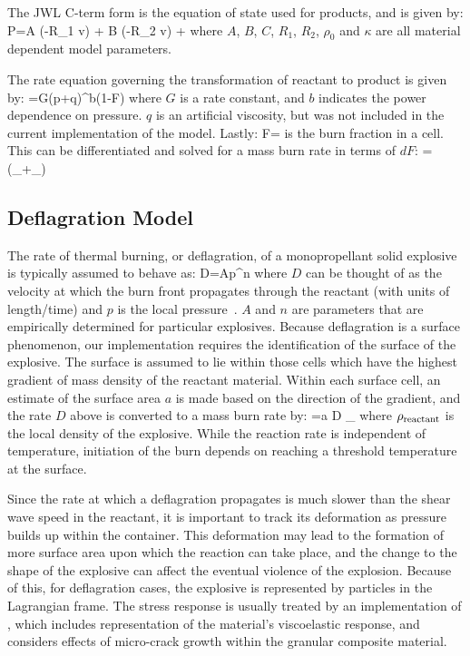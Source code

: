 The JWL C-term form is the equation of state used for products, and is 
given by:
\Beq
  P=A \exp(-R_1 v) + B \exp(-R_2 v) + 
  \label{JWLC}
\Eeq
where $A$, $B$, $C$, $R_1$, $R_2$, $\rho_0$ and $\kappa$ are all 
material dependent model parameters.

The rate equation governing the transformation of reactant to product is 
given by:
\Beq
  =G(p+q)^b(1-F)
  \label{JWL++rate}
\Eeq
where $G$ is a rate constant, and 
$b$ indicates the power dependence on pressure.  $q$ is an artificial 
viscosity, but was not included in the current implementation of
the model.  Lastly:
\Beq
  F= \frac{\rho_{\Tproduct}}{\rho_{\Treactant}+\rho_{\Tproduct}}
\Eeq
is the burn fraction in a cell.  This can be differentiated and solved for 
a mass burn rate in terms of $dF$:
\Beq
  \Gamma =  \left(\rho_{\Treactant}+\rho_{\Tproduct}\right)
\Eeq

\subsection{Deflagration Model}\label{sec:deflagration}

The rate of thermal burning, or deflagration, of a monopropellant 
solid explosive is typically assumed to behave as:
\Beq
  D=Ap^n
  \label{deflagration_rate}
\Eeq
where $D$ can be thought of as the velocity at which the burn front 
propagates through the reactant (with units of length/time) and $p$ is the 
local pressure~\cite{Son2000}.  $A$ and $n$ are parameters that are 
empirically determined for particular explosives.  
Because deflagration is a 
surface phenomenon, our implementation requires the identification of the 
surface of the explosive.  The surface is assumed to lie within those cells 
which have the highest gradient of mass density of the reactant 
material.  Within each surface cell, an estimate of the surface area $a$
is made based on the direction of the gradient, and the rate $D$ above 
is converted to a mass burn rate by:
\Beq
  \Gamma=a D \rho_{\Treactant}
  \label{deflagration_mass_rate}
\Eeq
where $\rho_{\text{reactant}}$ is the local density of the explosive.  While the reaction 
rate is independent of temperature, initiation of the burn depends 
on reaching a threshold temperature at the surface.

Since the rate at which a deflagration propagates is much slower than the 
shear wave speed in the reactant, it is important to track its deformation 
as pressure builds up within the container.  This deformation may lead to 
the formation of more surface area upon which the reaction can take place, and 
the change to the shape of the explosive can affect the eventual violence of the
explosion.  Because of this, for deflagration cases, the explosive is 
represented by particles in the Lagrangian frame.  The stress response is usually
treated by an implementation of  \cite{Hackett2000Viscoscram}, which includes 
representation of the material's viscoelastic response, and considers effects 
of micro-crack growth within the granular composite material.

